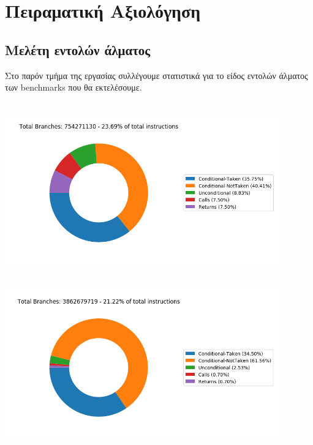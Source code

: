 \section{Πειραματική Αξιολόγηση}
\subsection{Μελέτη εντολών άλματος}
Στο παρόν τμήμα της εργασίας συλλέγουμε στατιστικά για το είδος εντολών άλματος των benchmarks που θα εκτελέσουμε.

\vspace{3mm}
   \begin{minipage}{\textwidth}
      \begin{center}
         \\
         \vspace{3mm}
         \includegraphics[width=0.9\textwidth, frame]{./graphs/4-1/403-gcc.png}
         \vspace{6mm}
      \end{center}
   \end{minipage}

   \begin{minipage}{\textwidth}
      \begin{center}
         \\
         \vspace{3mm}
         \includegraphics[width=0.9\textwidth, frame]{./graphs/4-1/429-mcf.png}
         \vspace{6mm}
      \end{center}
   \end{minipage}

